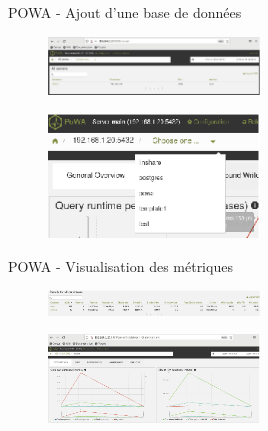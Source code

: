 
\begin{frame}{POWA - Ajout d'une base de données}

\begin{figure}
\begin{center}
\includegraphics[angle=0, width=0.5\textwidth]{images/powa_ajout_base1.eps}
\end{center}
\end{figure}

\begin{figure}
\begin{center}
\includegraphics[angle=0, width=0.5\textwidth]{images/powa_ajout_base2.eps}
\end{center}
\end{figure}


\end{frame}


\begin{frame}{POWA - Visualisation des métriques}

\begin{figure}
\begin{center}
\includegraphics[angle=0, width=0.5\textwidth]{images/powa_metrics1.eps}
\end{center}
\end{figure}

\begin{figure}
\begin{center}
\includegraphics[angle=0, width=0.5\textwidth]{images/powa_metrics2.eps}
\end{center}
\end{figure}

\end{frame}


